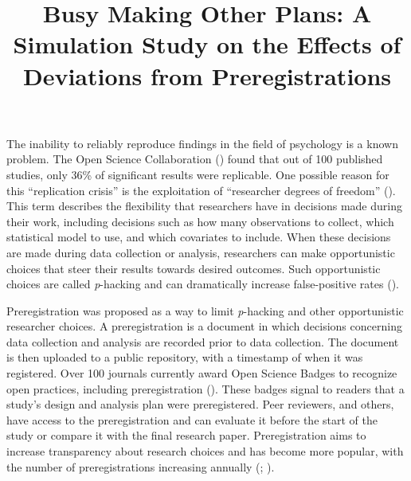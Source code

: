 \documentclass[
  man,
  floatsintext,
  longtable,
  nolmodern,
  notxfonts,
  notimes,
  colorlinks=true,linkcolor=blue,citecolor=blue,urlcolor=blue]{apa7}
\title{Busy Making Other Plans: A Simulation Study on the Effects of
Deviations from Preregistrations}
\newlength{\cslhangindent}
\begin{document}
\maketitle




\setlength\LTleft{0pt}



\ifdefined\Shaded\renewenvironment{Shaded}{\begin{snugshade}\begin{singlespace}}{\end{singlespace}\end{snugshade}}\fi

\setlength{\cslhangindent}{0.5in}

The inability to reliably reproduce findings in the field of psychology
is a known problem. The Open Science Collaboration
() found that out of
100 published studies, only 36\% of significant results were replicable.
One possible reason for this ``replication crisis'' is the exploitation
of ``researcher degrees of freedom'' (). This term describes the flexibility that researchers
have in decisions made during their work, including decisions such as
how many observations to collect, which statistical model to use, and
which covariates to include. When these decisions are made during data
collection or analysis, researchers can make opportunistic choices that
steer their results towards desired outcomes. Such opportunistic choices
are called \emph{p}-hacking and can dramatically increase false-positive
rates ().

Preregistration was proposed as a way to limit \emph{p}-hacking and
other opportunistic researcher choices. A preregistration is a document
in which decisions concerning data collection and analysis are recorded
prior to data collection. The document is then uploaded to a public
repository, with a timestamp of when it was registered. Over 100
journals currently award Open Science Badges to recognize open
practices, including preregistration (). These badges signal to readers that a study's design and
analysis plan were preregistered. Peer reviewers, and others, have
access to the preregistration and can evaluate it before the start of
the study or compare it with the final research paper. Preregistration
aims to increase transparency about research choices and has become more
popular, with the number of preregistrations increasing annually
(;
).
\end{document}
